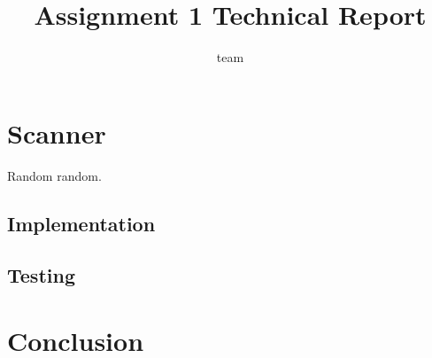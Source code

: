 \documentclass{report}
\title{Assignment 1 Technical Report}
\author{team}
\date{}
\begin{document}
\maketitle
\tableofcontents





\chapter{Scanner}


Random random.

\section{Implementation}

\section{Testing}


\chapter{Conclusion}



\end{document}
